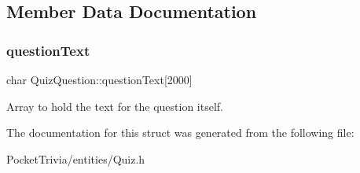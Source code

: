 \subsection{Member Data Documentation}
\mbox{\label{struct_quiz_question_ac451f58d95fccbf01fdfa5a26cf44b85}} 
\subsubsection{\texorpdfstring{questionText}{questionText}}
{\footnotesize\ttfamily char Quiz\+Question\+::question\+Text\mbox{[}2000\mbox{]}}



Array to hold the text for the question itself. 



The documentation for this struct was generated from the following file\+:\begin{DoxyCompactItemize}
\item 
Pocket\+Trivia/entities/Quiz.\+h\end{DoxyCompactItemize}
